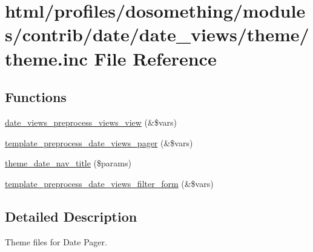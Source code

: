 \hypertarget{date_2date__views_2theme_2theme_8inc}{
\section{html/profiles/dosomething/modules/contrib/date/date\_\-views/theme/theme.inc File Reference}
\label{date_2date__views_2theme_2theme_8inc}
}
\subsection*{Functions}
\begin{DoxyCompactItemize}
\item 
\hyperlink{date_2date__views_2theme_2theme_8inc_ab67663862ed1c6814df08985535deac4}{date\_\-views\_\-preprocess\_\-views\_\-view} (\&\$vars)
\item 
\hyperlink{date_2date__views_2theme_2theme_8inc_a56a9786075b290f33f11b726d0cf2ea3}{template\_\-preprocess\_\-date\_\-views\_\-pager} (\&\$vars)
\item 
\hyperlink{date_2date__views_2theme_2theme_8inc_a9ee084f70e1a7136f0897268e2ef1f1b}{theme\_\-date\_\-nav\_\-title} (\$params)
\item 
\hyperlink{date_2date__views_2theme_2theme_8inc_a6f8e5b713bf6b16aa6ac6bb1f2a6836e}{template\_\-preprocess\_\-date\_\-views\_\-filter\_\-form} (\&\$vars)
\end{DoxyCompactItemize}


\subsection{Detailed Description}
Theme files for Date Pager. 

